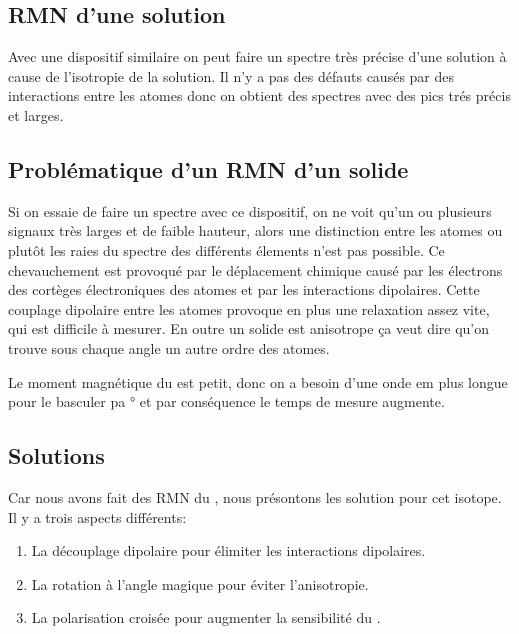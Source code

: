 \documentclass[a4paper,12pt]{scrartcl}
\begin{document}
\newpage
  \subsection{RMN d'une solution}
   Avec une dispositif similaire on peut faire un spectre très précise d'une solution à cause de l'isotropie de la solution. Il n'y a pas des défauts causés par des interactions entre les atomes donc on obtient des spectres avec des pics trés précis et larges.

  \subsection{Problématique d'un RMN d'un solide}
   Si on essaie de faire un spectre avec ce dispositif, on ne voit qu'un ou plusieurs signaux très larges et de faible hauteur, alors une distinction entre les atomes ou plutôt les raies du spectre des différents élements n'est pas possible. Ce chevauchement est provoqué par le déplacement chimique causé par les électrons des cortèges électroniques des atomes et par les interactions dipolaires. Cette couplage dipolaire entre les atomes provoque en plus une relaxation assez vite, qui est difficile à mesurer. En outre un solide est anisotrope \c ca veut dire qu'on trouve sous chaque angle un autre ordre des atomes. 

    Le moment magnétique du  est petit, donc on a besoin d'une onde em plus longue pour le basculer pa \unit[90]{\degree} et par conséquence le temps de mesure augmente.

  \subsection{Solutions}
   Car nous avons fait des RMN du , nous présontons les solution pour cet isotope. Il y a trois aspects différents:
   \begin{enumerate}
    \item La découplage dipolaire pour élimiter les interactions dipolaires.
    \item La rotation à l'angle magique pour éviter l'anisotropie.
    \item La polarisation croisée pour augmenter la sensibilité du .
   \end{enumerate}
\end{document}
